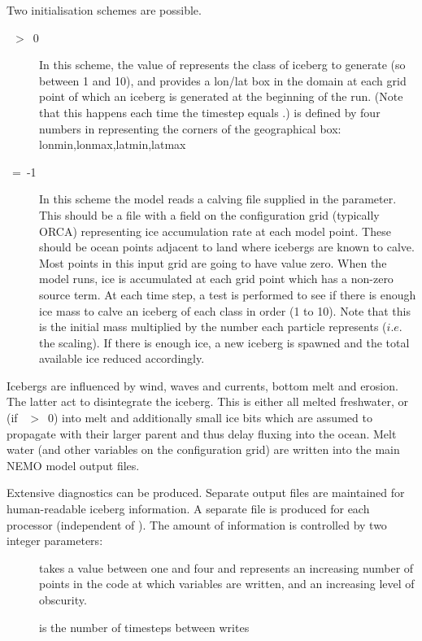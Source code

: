 Two initialisation schemes are possible.
\begin{description}
\item[~$>$~0]
In this scheme, the value of  represents the class of iceberg to generate 
(so between 1 and 10), and  provides a lon/lat box in the domain at each 
grid point of which an iceberg is generated at the beginning of the run. 
(Note that this happens each time the timestep equals .)
 is defined by four numbers in  representing the corners 
of the geographical box: lonmin,lonmax,latmin,latmax
\item[~=~-1]
In this scheme the model reads a calving file supplied in the  parameter.
This should be a file with a field on the configuration grid (typically ORCA) representing ice accumulation rate at each model point. 
These should be ocean points adjacent to land where icebergs are known to calve.
Most points in this input grid are going to have value zero.
When the model runs, ice is accumulated at each grid point which has a non-zero source term.
At each time step, a test is performed to see if there is enough ice mass to calve an iceberg of each class in order (1 to 10).
Note that this is the initial mass multiplied by the number each particle represents ($i.e.$ the scaling).
If there is enough ice, a new iceberg is spawned and the total available ice reduced accordingly.
\end{description}

Icebergs are influenced by wind, waves and currents, bottom melt and erosion.
The latter act to disintegrate the iceberg. This is either all melted freshwater, or 
(if ~$>$~0) into melt and additionally small ice bits
which are assumed to propagate with their larger parent and thus delay fluxing into the ocean.
Melt water (and other variables on the configuration grid) are written into the main NEMO model output files.

Extensive diagnostics can be produced.
Separate output files are maintained for human-readable iceberg information.
A separate file is produced for each processor (independent of ).
The amount of information is controlled by two integer parameters:
\begin{description}
\item[]  takes a value between one and four and represents 
an increasing number of points in the code at which variables are written, and an 
increasing level of obscurity.
\item[] is the number of timesteps between writes
\end{description}

